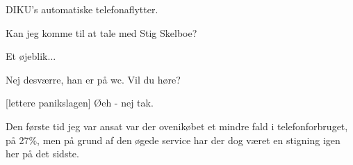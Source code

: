 \documentclass[a4paper,11pt]{article}
\begin{document}
\begin{sketch}
   DIKU's automatiske telefonaflytter.

   Kan jeg komme til at tale med Stig Skelboe?

   Et øjeblik... 

   Nej desværre, han er på wc.  Vil du høre?

  [lettere panikslagen] Øeh - nej tak.

   Den første tid jeg var ansat var der ovenikøbet et mindre
  fald i telefonforbruget, på 27\%, men på grund af den øgede service
  har der dog været en stigning igen her på det sidste.

\end{sketch}
\end{document}
